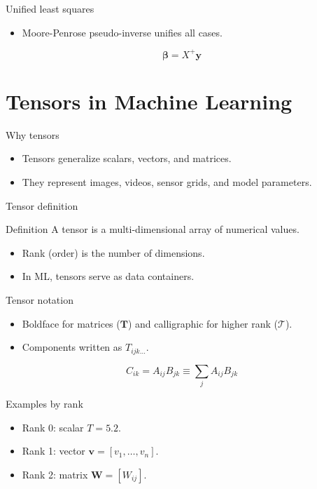 \documentclass[12pt]{beamer}
\begin{document}
\begin{frame}{Unified least squares}
  \begin{itemize}
    \item Moore-Penrose pseudo-inverse unifies all cases.
  \end{itemize}
  \[
  \boldsymbol{\beta} = X^+ \mathbf{y}
  \]
\end{frame}

\section{Tensors in Machine Learning}

\begin{frame}{Why tensors}
  \begin{itemize}
    \item Tensors generalize scalars, vectors, and matrices.
    \item They represent images, videos, sensor grids, and model parameters.
  \end{itemize}
\end{frame}

\begin{frame}{Tensor definition}
  \begin{conceptbox}{Definition}
    A tensor is a multi-dimensional array of numerical values.
  \end{conceptbox}
  \begin{itemize}
    \item Rank (order) is the number of dimensions.
    \item In ML, tensors serve as data containers.
  \end{itemize}
\end{frame}

\begin{frame}{Tensor notation}
  \begin{itemize}
    \item Boldface for matrices ($\bm{T}$) and calligraphic for higher rank ($\mathcal{T}$).
    \item Components written as $T_{ijk\dots}$.
  \end{itemize}
  \[
  C_{ik} = A_{ij} B_{jk} \equiv \sum_j A_{ij} B_{jk}
  \]
\end{frame}

\begin{frame}{Examples by rank}
  \begin{itemize}
    \item Rank 0: scalar $T = 5.2$.
    \item Rank 1: vector $\bm{v} = [v_1, \ldots, v_n]$.
    \item Rank 2: matrix $\bm{W} = [W_{ij}]$.
  \end{itemize}
\end{frame}
\end{document}
